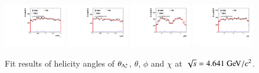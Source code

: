\begin{figure}[H]\centering
    \includegraphics[width=0.24\textwidth]{figure/polarimetery/angular_plots/pkpi_4640_cos_theta0.pdf}
    \includegraphics[width=0.24\textwidth]{figure/polarimetery/angular_plots/pkpi_4640_cos_theta1.pdf}
    \includegraphics[width=0.24\textwidth]{figure/polarimetery/angular_plots/pkpi_4640_phi1.pdf}
    \includegraphics[width=0.24\textwidth]{figure/polarimetery/angular_plots/pkpi_4640_phi2.pdf}
    \caption{Fit results of helicity angles of $\theta_{\Lambda_{c}^{+}}$, $\theta$, $\phi$ and $\chi$ at $\sqrt{s} = 4.641\gev/c^2$.}
\label{fig:fit_angular_s3}
\end{figure}

